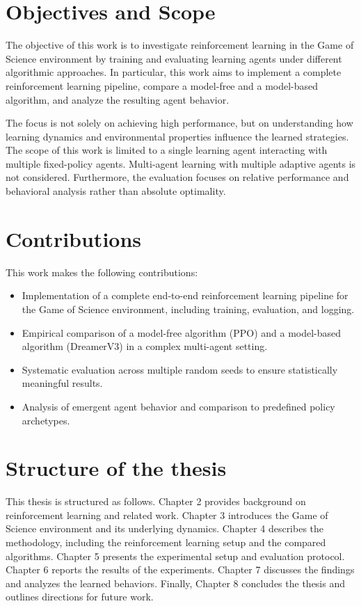 \documentclass[english,bachelor]{hsluthesis}
\begin{document}
\section{Objectives and Scope}
The objective of this work is to investigate reinforcement learning in the Game of Science environment by training and evaluating learning agents under different algorithmic approaches. In particular, this work aims to implement a complete reinforcement learning pipeline, compare a model-free and a model-based algorithm, and analyze the resulting agent behavior.

The focus is not solely on achieving high performance, but on understanding how learning dynamics and environmental properties influence the learned strategies.
The scope of this work is limited to a single learning agent interacting with multiple fixed-policy agents. Multi-agent learning with multiple adaptive agents is not considered. Furthermore, the evaluation focuses on relative performance and behavioral analysis rather than absolute optimality.
\section{Contributions}
This work makes the following contributions:
\begin{itemize}
    \item Implementation of a complete end-to-end reinforcement learning pipeline for the Game of Science environment, including training, evaluation, and logging.
    \item Empirical comparison of a model-free algorithm (PPO) and a model-based algorithm (DreamerV3) in a complex multi-agent setting.
    \item Systematic evaluation across multiple random seeds to ensure statistically meaningful results.
    \item Analysis of emergent agent behavior and comparison to predefined policy archetypes.
\end{itemize}
\section{Structure of the thesis}
This thesis is structured as follows. Chapter 2 provides background on reinforcement learning and related work. Chapter 3 introduces the Game of Science environment and its underlying dynamics. Chapter 4 describes the methodology, including the reinforcement learning setup and the compared algorithms. Chapter 5 presents the experimental setup and evaluation protocol. Chapter 6 reports the results of the experiments. Chapter 7 discusses the findings and analyzes the learned behaviors. Finally, Chapter 8 concludes the thesis and outlines directions for future work.
\end{document}
